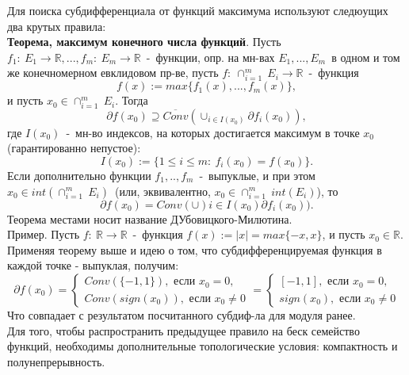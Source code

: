 Для поиска субдифференциала от функций максимума используют следюущих два крутых правила:\\

\textbf{Теорема, максимум конечного числа функций}. Пусть $f_1:~E_1 \to \mathbb{R},...,f_m:~E_m \to \mathbb{R}$~-~функции, опр. на мн-вах $E_1,...,E_m$~в одном и том же конечномерном евклидовом пр-ве, пусть $f:~\cap^m_{i=1}~E_i \to \mathbb{R}$~-~функция
$$
f(x):=max\{f_1(x),...,f_m(x)\},
$$
и пусть $x_0 \in \cap^m_{i=1}~E_i$. Тогда
$$
\partial f(x_0) \supseteq \overline{Conv}(\cup_{i \in I(x_0)}\partial f_i(x_0)),
$$
где $I(x_0)$~-~мн-во индексов, на которых достигается максимум в точке $x_0$ (гарантированно непустое):
$$
I(x_0):=\{1 \leq i \leq m:~f_i(x_0)=f(x_0)\}.
$$
Если дополнительно функции $f_1,..,f_m$~-~выпуклые, и при этом $x_0 \in int(\cap^m_{i=1}~E_i)$~(или, эквивалентно, $x_0 \in \cap^m_{i=1}~int(E_i)$), то
$$
\partial f(x_0)=Conv(\cup){i \in I(x_0)}\partial f_i(x_0)).
$$
Теорема местами носит название ДУбовицкого-Милютина.\\

Пример. Пусть $f:~\mathbb{R} \to \mathbb{R}$~-~функция $f(x):=|x|=max\{-x,x\}$, и пусть $x_0 \in \mathbb{R}$. Применяя теорему выше и идею о том, что субдифференцируемая функция в каждой точке - выпуклая, получим:
$$
\partial f(x_0)=\begin{cases}
                Conv(\{-1,1\}), \text{~если~}x_0=0,\\
                Conv({sign(x_0)}),\text{~если~}x_0 \neq 0
\end{cases} = \begin{cases}
[-1,1]
              ,\text{~если~}x_0=0,\\
              {sign(x_0)},\text{~если~}x_0 \neq 0
\end{cases}
$$
Что совпадает с результатом посчитанного субдиф-ла для модуля ранее.\\

Для того, чтобы распространить предыдущее правило на беск семейство функций, необходимы дополнительные топологические условия: компактность и полунепрерывность.\\

